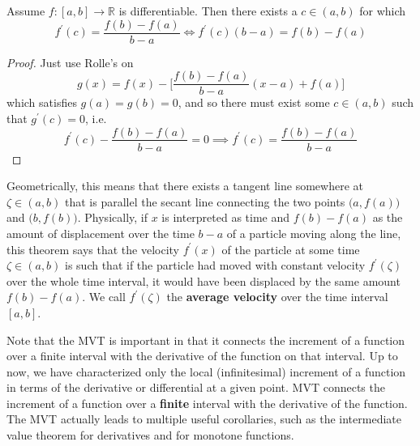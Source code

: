   \begin{theorem}
		\label{thm:mvt}
    Assume $f: [a, b] \to \mathbb{R}$ is differentiable. Then there exists a $c \in (a, b)$ for which 
    \begin{equation}
      f^\prime (c) = \frac{f(b) - f(a)}{b - a} \iff f^\prime (c) (b - a) = f(b) - f(a)
    \end{equation}
  \end{theorem}
  \begin{proof}
    Just use Rolle's on 
    \begin{equation}
      g(x) = f(x) - \bigg[ \frac{f(b) - f(a)}{b - a} (x - a) + f(a) \bigg]
    \end{equation}
    which satisfies $g(a) = g(b) = 0$, and so there must exist some $c \in (a, b)$ such that $g^\prime (c) = 0$, i.e. 
    \begin{equation}
      f^\prime (c) - \frac{f(b) - f(a)}{b - a} = 0 \implies f^\prime (c) = \frac{f(b) - f(a)}{b - a}
    \end{equation}
  \end{proof} 

  Geometrically, this means that there exists a tangent line somewhere at $\zeta \in (a, b)$ that is parallel the secant line connecting the two points $\big(a, f(a)\big)$ and $\big( b, f(b)\big)$. Physically, if $x$ is interpreted as time and $f(b) - f(a)$ as the amount of displacement over the time $b-a$ of a particle moving along the line, this theorem says that the velocity $f^\prime (x)$ of the particle at some time $\zeta \in (a, b)$ is such that if the particle had moved with constant velocity $f^\prime (\zeta)$ over the whole time interval, it would have been displaced by the same amount $f(b) - f(a)$. We call $f^\prime (\zeta)$ the \textbf{average velocity} over the time interval $[a, b]$. 

  Note that the MVT is important in that it connects the increment of a function over a finite interval with the derivative of the function on that interval. Up to now, we have characterized only the local (infinitesimal) increment of a function in terms of the derivative or differential at a given point. MVT connects the increment of a function over a \textbf{finite} interval with the derivative of the function. The MVT actually leads to multiple useful corollaries, such as the intermediate value theorem for derivatives and for monotone functions. 

